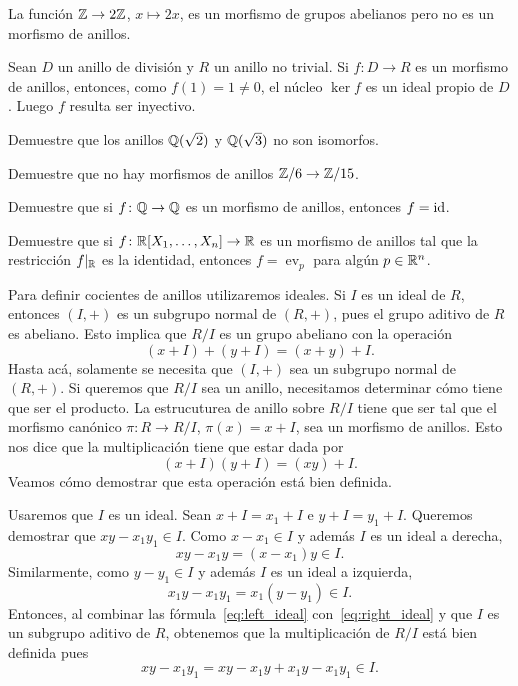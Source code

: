 \begin{example}
La función $\mathbb{Z}\to 2\mathbb{Z}$, $x\mapsto 2x$, es un morfismo de grupos abelianos pero no es un morfismo de anillos. 	
\end{example}

\begin{example}
Sean $D$ un anillo de división y $R$ un anillo no trivial. Si $f\colon D\to R$ es un morfismo de anillos, entonces, como $f(1)=1\ne0$,
el núcleo $\ker f$ es un ideal propio de $D$. Luego $f$ resulta ser inyectivo.   	 
\end{example}

\begin{exercise}
\label{xca:sqrt2sqrt3}
Demuestre que los anillos $\mathbb{Q}(\sqrt{2})$ y $\mathbb{Q}(\sqrt{3})$ no son isomorfos.	
\end{exercise}

\begin{exercise}
\label{xca:Z6Z15}
Demuestre que no hay morfismos de anillos $\mathbb{Z}/6\to\mathbb{Z}/15$. 	
\end{exercise}

\begin{exercise}
Demuestre que si $f\colon \mathbb{Q}\to\mathbb{Q}$ es un morfismo de anillos, entonces $f=\operatorname{id}$.  	
\end{exercise}

\begin{exercise}
Demuestre que si $f\colon\mathbb{R}[X_1,\dots,X_n]\to\mathbb{R}$ es un morfismo de anillos tal que la restricción $f|_{\mathbb{R}}$ es la identidad, entonces $f=\operatorname{ev}_{p}$ para algún $p\in\mathbb{R}^n$. 	
\end{exercise}

Para definir cocientes de anillos utilizaremos ideales. Si $I$ es
un ideal de $R$, entonces $(I,+)$ es un subgrupo normal de $(R,+)$, pues el grupo aditivo de $R$ es abeliano. Esto implica que
$R/I$ es un grupo abeliano con la operación
\[
(x+I)+(y+I)=(x+y)+I.
\]
Hasta acá, solamente se necesita que $(I,+)$ sea un subgrupo normal de $(R,+)$. Si queremos que $R/I$ sea un anillo, necesitamos
determinar cómo tiene que ser el producto. La 
estrucuturea de anillo sobre $R/I$ tiene que ser tal que el morfismo canónico   
$\pi\colon R\to R/I$, $\pi(x)=x+I$, sea un morfismo de anillos. Esto nos dice que la multiplicación 
tiene que estar dada por
\[
(x+I)(y+I)=(xy)+I.
\]
Veamos cómo demostrar que esta operación está bien definida. 

Usaremos que $I$ es un ideal. 
Sean $x+I=x_{1}+I$ e $y+I=y_{1}+I$. Queremos demostrar que $xy-x_{1}y_{1}\in I$.
Como $x-x_{1}\in I$ y además $I$ es un ideal a derecha, 
\begin{equation}
xy-x_{1}y=(x-x_{1})y\in I.\label{eq:right_ideal}
\end{equation}
Similarmente, como $y-y_{1}\in I$ y además $I$ es un ideal a izquierda,  
\begin{equation}
x_{1}y-x_{1}y_{1}=x_{1}(y-y_{1})\in I.\label{eq:left_ideal}
\end{equation}
Entonces, al combinar las fórmula~\eqref{eq:left_ideal} con~\eqref{eq:right_ideal} y 
que $I$ es un subgrupo aditivo de $R$, obtenemos que 
la multiplicación de $R/I$ está bien definida pues  
\[
xy-x_{1}y_{1}=xy-x_{1}y+x_{1}y-x_{1}y_{1}\in I.
\]

